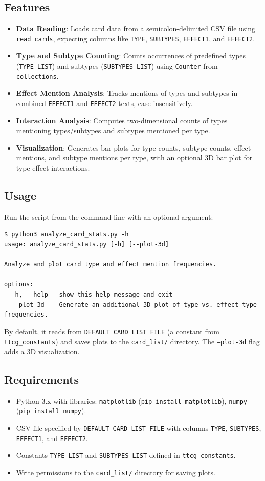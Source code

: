 \subsection{Features}
\begin{itemize}
	\item \textbf{Data Reading}: Loads card data from a semicolon-delimited CSV file using \texttt{read\_cards}, expecting columns like \texttt{TYPE}, \texttt{SUBTYPES}, \texttt{EFFECT1}, and \texttt{EFFECT2}.
	\item \textbf{Type and Subtype Counting}: Counts occurrences of predefined types (\texttt{TYPE\_LIST}) and subtypes (\texttt{SUBTYPES\_LIST}) using \texttt{Counter} from \texttt{collections}.
	\item \textbf{Effect Mention Analysis}: Tracks mentions of types and subtypes in combined \texttt{EFFECT1} and \texttt{EFFECT2} texts, case-insensitively.
	\item \textbf{Interaction Analysis}: Computes two-dimensional counts of types mentioning types/subtypes and subtypes mentioned per type.
	\item \textbf{Visualization}: Generates bar plots for type counts, subtype counts, effect mentions, and subtype mentions per type, with an optional 3D bar plot for type-effect interactions.
\end{itemize}

\subsection{Usage}
Run the script from the command line with an optional argument:
\begin{lstlisting}[style=terminalstyle]
$ python3 analyze_card_stats.py -h
usage: analyze_card_stats.py [-h] [--plot-3d]

Analyze and plot card type and effect mention frequencies.

options:
  -h, --help   show this help message and exit
  --plot-3d    Generate an additional 3D plot of type vs. effect type frequencies.
\end{lstlisting}
By default, it reads from \texttt{DEFAULT\_CARD\_LIST\_FILE} (a constant from \texttt{ttcg\_constants}) and saves plots to the \texttt{card\_list/} directory. The \texttt{--plot-3d} flag adds a 3D visualization.

\subsection{Requirements}
\begin{itemize}
	\item Python 3.x with libraries: \texttt{matplotlib} (\texttt{pip install matplotlib}), \texttt{numpy} (\texttt{pip install numpy}).
	\item CSV file specified by \texttt{DEFAULT\_CARD\_LIST\_FILE} with columns \texttt{TYPE}, \texttt{SUBTYPES}, \texttt{EFFECT1}, and \texttt{EFFECT2}.
	\item Constants \texttt{TYPE\_LIST} and \texttt{SUBTYPES\_LIST} defined in \texttt{ttcg\_constants}.
	\item Write permissions to the \texttt{card\_list/} directory for saving plots.
\end{itemize}

